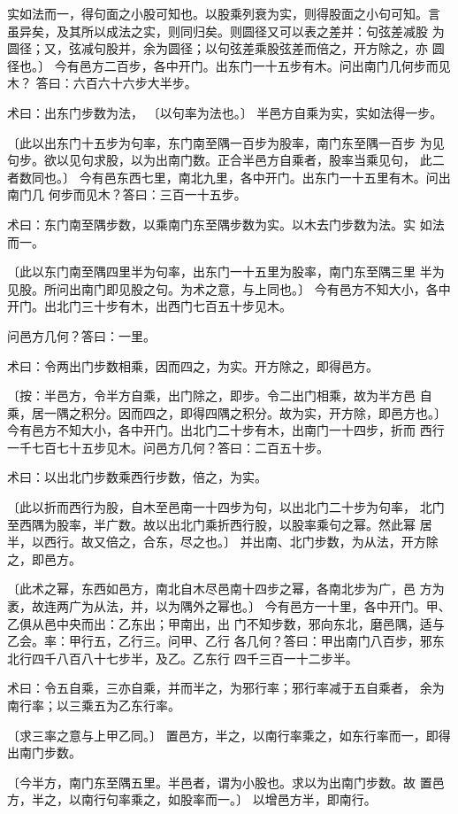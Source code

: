 \documentclass[12pt,UTF8]{ctexbook}
\begin{document}
实如法而一，得句面之小股可知也。以股乘列衰为实，则得股面之小句可知。言 虽异矣，及其所以成法之实，则同归矣。则圆径又可以表之差并：句弦差减股 为圆径；又，弦减句股并，余为圆径；以句弦差乘股弦差而倍之，开方除之，亦 圆径也。〕 今有邑方二百步，各中开门。出东门一十五步有木。问出南门几何步而见木？ 答曰：六百六十六步大半步。

术曰：出东门步数为法， 〔以句率为法也。〕 半邑方自乘为实，实如法得一步。

〔此以出东门十五步为句率，东门南至隅一百步为股率，南门东至隅一百步 为见句步。欲以见句求股，以为出南门数。正合半邑方自乘者，股率当乘见句， 此二者数同也。〕 今有邑东西七里，南北九里，各中开门。出东门一十五里有木。问出南门几 何步而见木？答曰：三百一十五步。

术曰：东门南至隅步数，以乘南门东至隅步数为实。以木去门步数为法。实 如法而一。

〔此以东门南至隅四里半为句率，出东门一十五里为股率，南门东至隅三里 半为见股。所问出南门即见股之句。为术之意，与上同也。〕 今有邑方不知大小，各中开门。出北门三十步有木，出西门七百五十步见木。

问邑方几何？答曰：一里。

术曰：令两出门步数相乘，因而四之，为实。开方除之，即得邑方。

〔按：半邑方，令半方自乘，出门除之，即步。令二出门相乘，故为半方邑 自乘，居一隅之积分。因而四之，即得四隅之积分。故为实，开方除，即邑方也。〕 今有邑方不知大小，各中开门。出北门二十步有木，出南门一十四步，折而 西行一千七百七十五步见木。问邑方几何？答曰：二百五十步。

术曰：以出北门步数乘西行步数，倍之，为实。

〔此以折而西行为股，自木至邑南一十四步为句，以出北门二十步为句率， 北门至西隅为股率，半广数。故以出北门乘折西行股，以股率乘句之幂。然此幂 居半，以西行。故又倍之，合东，尽之也。〕 并出南、北门步数，为从法，开方除之，即邑方。

〔此术之幂，东西如邑方，南北自木尽邑南十四步之幂，各南北步为广，邑 方为袤，故连两广为从法，并，以为隅外之幂也。〕 今有邑方一十里，各中开门。甲、乙俱从邑中央而出：乙东出；甲南出，出 门不知步数，邪向东北，磨邑隅，适与乙会。率：甲行五，乙行三。问甲、乙行 各几何？答曰：甲出南门八百步，邪东北行四千八百八十七步半，及乙。乙东行 四千三百一十二步半。

术曰：令五自乘，三亦自乘，并而半之，为邪行率；邪行率减于五自乘者， 余为南行率；以三乘五为乙东行率。

〔求三率之意与上甲乙同。〕 置邑方，半之，以南行率乘之，如东行率而一，即得出南门步数。

〔今半方，南门东至隅五里。半邑者，谓为小股也。求以为出南门步数。故 置邑方，半之，以南行句率乘之，如股率而一。〕 以增邑方半，即南行。
\end{document}
